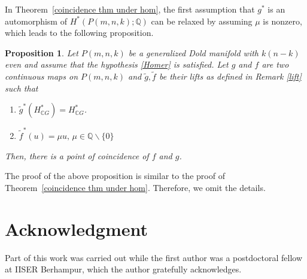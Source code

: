 \documentclass{amsart}
\newtheorem{proposition}[theorem]{Proposition}
\newcommand{\thmref}[1]{Theorem~\ref{#1}}
\begin{document}
In \thmref{coincidence thm under hom}, the first assumption that $g^*$ is an automorphism %
of $H^*(P(m,n,k); \mathbb{Q})$ can %
be relaxed by assuming $\mu$ is nonzero, which leads %
to the following proposition. 
\begin{proposition}
	Let %
$P(m,n,k)$ be a generalized Dold manifold with $k(n-k)$ even and assume that the hypothesis \eqref{Homer} is satisfied. Let $g$ and $f$ are two continuous maps on $P(m,n,k)$ and $\tilde g, \tilde f$ be their lifts as defined in  Remark \ref{lift} such %
that
	\begin{enumerate}
		\item $\tilde g^*(H^*_{\mathbb CG})= H^*_{\mathbb CG}$. %
		\item $\tilde f^*(u)=\mu u,\, \mu\in \mathbb Q\backslash \{0\}$
	\end{enumerate}
Then, there is a point of coincidence of $f$ and  $g$.
\end{proposition}
The proof of the above proposition is similar to the proof of \thmref{coincidence thm under hom}. Therefore, we omit the %
details.

\section*{Acknowledgment}
Part %
of this work was carried out while the first author was a postdoctoral fellow at IISER Berhampur, which the author gratefully acknowledges.
\end{document}
